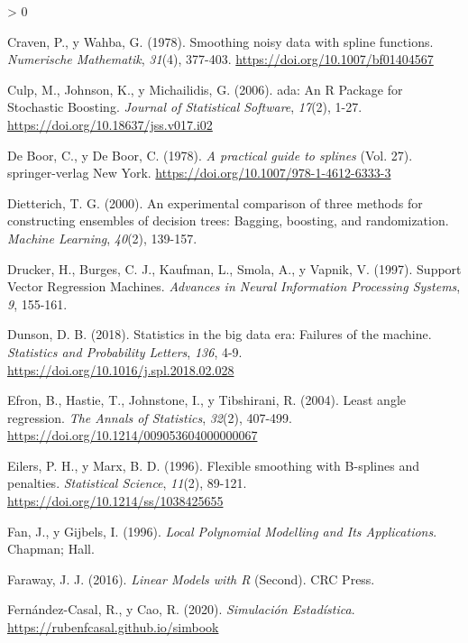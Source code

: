 \documentclass[
  spanish,
]{book}
\theoremstyle{break}
\newlength{\cslhangindent}
\newenvironment{CSLReferences}[2] %
 {%
  \setlength{\parindent}{0pt}
  \ifodd #1 \everypar{\setlength{\hangindent}{\cslhangindent}}\ignorespaces\fi
  \ifnum #2 > 0
  \setlength{\parskip}{#2\baselineskip}
  \fi
 }%
 {}
\theoremstyle{definition}
\theoremstyle{definition}
\theoremstyle{definition}
\theoremstyle{definition}
\theoremstyle{remark}
\begin{document}
\begin{CSLReferences}{1}{0}
\leavevmode\hypertarget{ref-craven1978smoothing}{}%
Craven, P., y Wahba, G. (1978). Smoothing noisy data with spline functions. \emph{Numerische Mathematik}, \emph{31}(4), 377-403. \url{https://doi.org/10.1007/bf01404567}

\leavevmode\hypertarget{ref-culp2006ada}{}%
Culp, M., Johnson, K., y Michailidis, G. (2006). ada: An R Package for Stochastic Boosting. \emph{Journal of Statistical Software}, \emph{17}(2), 1-27. \url{https://doi.org/10.18637/jss.v017.i02}

\leavevmode\hypertarget{ref-de1978practical}{}%
De Boor, C., y De Boor, C. (1978). \emph{A practical guide to splines} (Vol. 27). springer-verlag New York. \url{https://doi.org/10.1007/978-1-4612-6333-3}

\leavevmode\hypertarget{ref-dietterich2000experimental}{}%
Dietterich, T. G. (2000). An experimental comparison of three methods for constructing ensembles of decision trees: Bagging, boosting, and randomization. \emph{Machine Learning}, \emph{40}(2), 139-157.

\leavevmode\hypertarget{ref-drucker1997support}{}%
Drucker, H., Burges, C. J., Kaufman, L., Smola, A., y Vapnik, V. (1997). Support Vector Regression Machines. \emph{Advances in Neural Information Processing Systems}, \emph{9}, 155-161.

\leavevmode\hypertarget{ref-dunson2018statistics}{}%
Dunson, D. B. (2018). Statistics in the big data era: Failures of the machine. \emph{Statistics and Probability Letters}, \emph{136}, 4-9. \url{https://doi.org/10.1016/j.spl.2018.02.028}

\leavevmode\hypertarget{ref-efron2004least}{}%
Efron, B., Hastie, T., Johnstone, I., y Tibshirani, R. (2004). Least angle regression. \emph{The Annals of Statistics}, \emph{32}(2), 407-499. \url{https://doi.org/10.1214/009053604000000067}

\leavevmode\hypertarget{ref-eilers1996flexible}{}%
Eilers, P. H., y Marx, B. D. (1996). Flexible smoothing with B-splines and penalties. \emph{Statistical Science}, \emph{11}(2), 89-121. \url{https://doi.org/10.1214/ss/1038425655}

\leavevmode\hypertarget{ref-fan1996}{}%
Fan, J., y Gijbels, I. (1996). \emph{Local Polynomial Modelling and Its Applications}. Chapman; Hall.

\leavevmode\hypertarget{ref-faraway2014linear}{}%
Faraway, J. J. (2016). \emph{Linear Models with R} (Second). CRC Press.

\leavevmode\hypertarget{ref-fernandez2020simbook}{}%
Fernández-Casal, R., y Cao, R. (2020). \emph{Simulación Estadística}. \url{https://rubenfcasal.github.io/simbook}


\end{CSLReferences}
\end{document}
